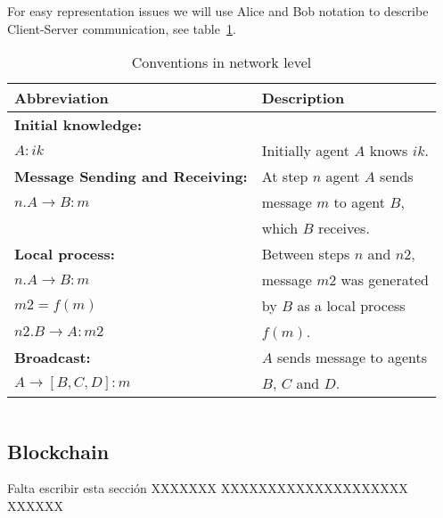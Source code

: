 For easy representation issues we will use Alice and Bob notation to 
describe Client-Server communication, see table~\ref{table:NetConventions}.
\begin{table}[htb]
\footnotesize
\begin{center}
\caption{Conventions in network level}
\label{table:NetConventions}
\begin{tabular}{|l|l|}
\hline
{\bf Abbreviation}                      & {\bf Description}                    \\\hline\hline
\textbf{Initial knowledge:}             &                                      \\
$A : ik$                                &  Initially agent $A$ knows $ik$.    \\ \hline 
\textbf{Message Sending and Receiving:} &  At step $n$ agent $A$ sends         \\ 
$n. A \rightarrow B: m$                 &  message $m$ to agent $B$,\\
                                        &  which $B$ receives.      \\ \hline 
\textbf{Local process:}  &  Between steps $n$ and $n2$,    \\ 
$n. A\rightarrow B: m$                  &  message $m2$ was generated \\ 
\hspace{5mm}$m2 = f(m)$                 &  by $B$ as a local process \\ 
$n2. B\rightarrow A: m2$                &  $f(m)$.                  \\ \hline 
\textbf{Broadcast:}      &  $A$ sends message to agents\\ 
$A \rightarrow [B, C, D]: m$            &  $B$, $C$ and $D$.\\ \hline \hline 
\end{tabular}
\end{center}
\end{table}
\normalsize


$$$$



\subsection{Blockchain}
Falta escribir esta sección XXXXXXX
XXXXXXXXXXXXXXXXXXXX
XXXXXX





